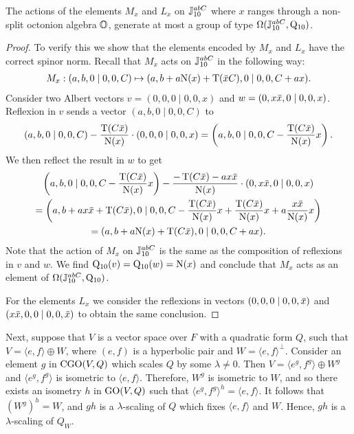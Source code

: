 \begin{proposition}
	The actions of the elements $M_x$ and $L_x$ on $\mathbb{J}_{10}^{abC}$ where $x$ ranges through
	a non-split octonion algebra $\mathbb{O}$, generate at most a group of type $\Omega( \mathbb{J}_{10}^{abC},
	 \mathord{\mathrm{Q}}_{10} )$.
\end{proposition}

\begin{proof}
	To verify this we show that the elements encoded by $M_x$ and $L_x$ have the correct spinor
	norm. Recall that $M_x$ acts on $\mathbb{J}_{10}^{abC}$ in the following way:
	\begin{equation*}
		\begin{array}{r@{\;}c@{\;}l}
		M_x: (a,b,0\mid 0,0,C) & \mapsto & (a,b+a\NN(x)+\Tr(\ovx C),0 \mid 
										0, 0, C+ax).
		\end{array}
	\end{equation*}
	Consider two Albert vectors $v = (0,0,0\mid 0,0,x)$ and $w = (0,x \mathord{\mbox{\hspace*{0pt}}\,\overline{\!x\!\!\;}\!\:}\mbox{\hspace*{0pt}}, 0 \mid 0,0, x)$. 
	Reflexion in $v$ sends a vector $(a,b,0\mid 0,0,C)$ to
	\begin{equation*}
		(a,b,0\mid 0,0,C) - \frac{\Tr(C\ovx)}{\NN(x)} \cdot (0,0,0\mid 0,0,x) =
			\left(a,b,0\mid 0,0, C - \frac{\Tr(C\ovx)}{\NN(x)} x\right).
	\end{equation*}
	We then reflect the result in $w$ to get
	\begin{multline*}
		\left(a,b,0\mid 0,0, C - \frac{\Tr(C\ovx)}{\NN(x)} x\right) - 
			\frac{-\Tr(C\ovx) - a x \ovx}{\NN(x)} \cdot (0,x\ovx,0\mid 0,0,x) \\
		= \left(a, b+ax\ovx + \Tr(C\ovx), 0 \mid 0,0, C - \frac{\Tr(C\ovx)}{\NN(x)}x + 
		\frac{\Tr(C\ovx)}{\NN(x)} x + a \frac{ x\ovx }{\NN(x)} x \right) \\
		= (a, b+a\NN(x)+\Tr(C\ovx), 0 \mid 0,0, C + ax).
	\end{multline*}
	Note that the action of $M_x$ on $\mathbb{J}_{10}^{abC}$ is the same as the composition
	of reflexions in $v$ and $w$. We find $\mathord{\mathrm{Q}}_{10}(v) = \mathord{\mathrm{Q}}_{10}(w) = \mathord{\mathrm{N}}(x)$ and conclude that 
	$M_x$ acts as an element of $\Omega(\mathbb{J}_{10}^{abC}, \mathord{\mathrm{Q}}_{10})$. 
	
	For the elements $L_x$ we consider the reflexions in vectors $(0,0,0\mid 0,0,\mathord{\mbox{\hspace*{0pt}}\,\overline{\!x\!\!\;}\!\:}\mbox{\hspace*{0pt}})$ and
	$(x\ovx,0,0\mid 0,0,\ovx)$ to obtain the same conclusion. 
\end{proof}

Next, suppose that $V$ is a vector space over $F$ with a quadratic form $Q$, 
such that $V = \langle e,f \rangle  \oplus W$, where $(e, f)$ is a hyperbolic pair and 
$W = \langle e, f \rangle^{\perp}$. Consider an element $g$ in $\mathrm{CGO}(V,Q)$ which scales $Q$ 
by some $\lambda \neq 0$. Then
$V = \langle e^g, f^g \rangle \oplus W^g$ and $\langle e^g, f^g \rangle$ is
isometric to $\langle e, f \rangle$. Therefore, $W^g$ is isometric to 
$W$, and so there exists an isometry $h$ in $\mathrm{GO}(V,Q)$ such that 
$\langle e^g, f^g \rangle^h = \langle e, f \rangle$. It follows that 
$(W^g)^h = W$, and $gh$ is a $\lambda$-scaling of $Q$ which fixes
$\langle e, f \rangle$ and $W$. Hence, $gh$ is a $\lambda$-scaling of $Q_W$. 


